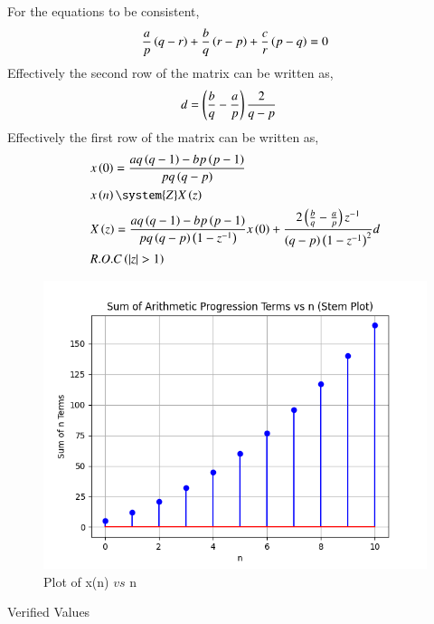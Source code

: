 \documentclass[journal,12pt,twocolumn]{IEEEtran}
\theoremstyle{remark}
\begin{document}
For the equations to be consistent,
\begin{align}
    {\frac{a}{p}\ensuremath{\left(q-r\right)}+\frac{b}{q}\ensuremath{\left(r-p\right)}+\frac{c}{r}\ensuremath{\left(p-q\right)}}=0
\end{align}
Effectively the second row of the matrix can be written as,
\begin{align}
    &d=\left(\frac{b}{q}-\frac{a}{p}\right)\frac{2}{q-p}
\end{align}
Effectively the first row of the matrix can be written as,
\begin{align}
    &x\brak{0}=\frac{aq\brak{q-1}-bp\brak{p-1}}{pq\brak{q-p}}\\
    &x \brak{n} \system{Z} X \brak{z}\\
    &X\brak{z}=\frac{aq\brak{q-1}-bp\brak{p-1}}{pq\brak{q-p}\brak{1-z^{-1}}}x\brak{0}+\frac{2\brak{\frac{b}{q}-\frac{a}{p}}z^{-1}}{\brak{q-p}\brak{1-z^{-1}}^{2}}d\\
    &R.O.C\brak{|z|>1}
\end{align}
\begin{figure}[ht]
    \centering
    \includegraphics[width=\columnwidth]{figs/Figure_1.png}
    \caption{Plot of x(n) $vs$ n}
    \label{fig:11.9.2.11.2}
\end{figure}
\begin{table}[ht]
    \centering
    \def\arraystretch{1.5}
    
    \caption{Verified Values}
    \label{tab:11.9.2.11.3}
\end{table}
\end{document}
